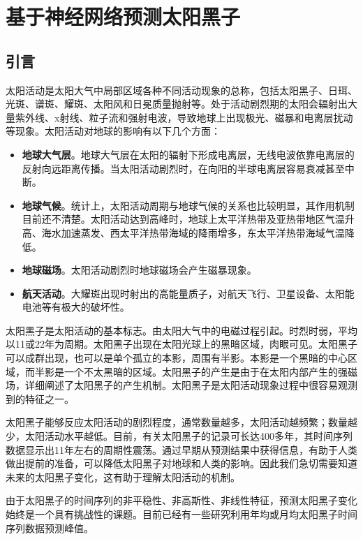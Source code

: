 \chapter{基于神经网络预测太阳黑子}\label{chap:ml_sunspot}

\section{引言}\label{sec:ss_intro}

太阳活动是太阳大气中局部区域各种不同活动现象的总称，包括太阳黑子、日珥、光斑、谱斑、耀斑、太阳风和日冕质量抛射等。处于活动剧烈期的太阳会辐射出大量紫外线、x射线、粒子流和强射电波，导致地球上出现极光、磁暴和电离层扰动等现象。太阳活动对地球的影响有以下几个方面\citep{jie2012prediction}：
\begin{itemize}
  \item \textbf{地球大气层}。地球大气层在太阳的辐射下形成电离层，无线电波依靠电离层的反射向远距离传播。当太阳活动剧烈时，在向阳的半球电离层容易衰减甚至中断。
  \item \textbf{地球气候}。统计上，太阳活动周期与地球气候的关系也比较明显，其作用机制目前还不清楚。太阳活动达到高峰时，地球上太平洋热带及亚热带地区气温升高、海水加速蒸发、西太平洋热带海域的降雨增多，东太平洋热带海域气温降低。
  \item \textbf{地球磁场}。太阳活动剧烈时地球磁场会产生磁暴现象。
  \item \textbf{航天活动}。大耀斑出现时射出的高能量质子，对航天飞行、卫星设备、太阳能电池等有极大的破坏性。
\end{itemize}

太阳黑子是太阳活动的基本标志。由太阳大气中的电磁过程引起。时烈时弱，平均以11或22年为周期。太阳黑子出现在太阳光球上的黑暗区域，肉眼可见。太阳黑子可以成群出现，也可以是单个孤立的本影，周围有半影。本影是一个黑暗的中心区域，而半影是一个不太黑暗的区域。太阳黑子的产生是由于在太阳内部产生的强磁场，\citet{noyes2013sun}详细阐述了太阳黑子的产生机制。太阳黑子是太阳活动现象过程中很容易观测到的特征之一。

太阳黑子能够反应太阳活动的剧烈程度，通常数量越多，太阳活动越频繁；数量越少，太阳活动水平越低。目前，有关太阳黑子的记录可长达400多年，其时间序列数据显示出11年左右的周期性震荡。通过早期从预测结果中获得信息，有助于人类做出提前的准备，可以降低太阳黑子对地球和人类的影响。因此我们急切需要知道未来的太阳黑子变化，这有助于理解太阳活动的机制。

由于太阳黑子的时间序列的非平稳性、非高斯性、非线性特征，预测太阳黑子变化始终是一个具有挑战性的课题。目前已经有一些研究利用年均或月均太阳黑子时间序列数据预测峰值。

